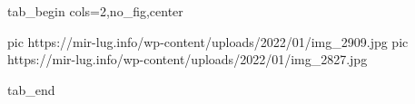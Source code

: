  
 
 
 
 


\ifcmt
  tab_begin cols=2,no_fig,center

     pic https://mir-lug.info/wp-content/uploads/2022/01/img_2909.jpg
		 pic https://mir-lug.info/wp-content/uploads/2022/01/img_2827.jpg

  tab_end
\fi
